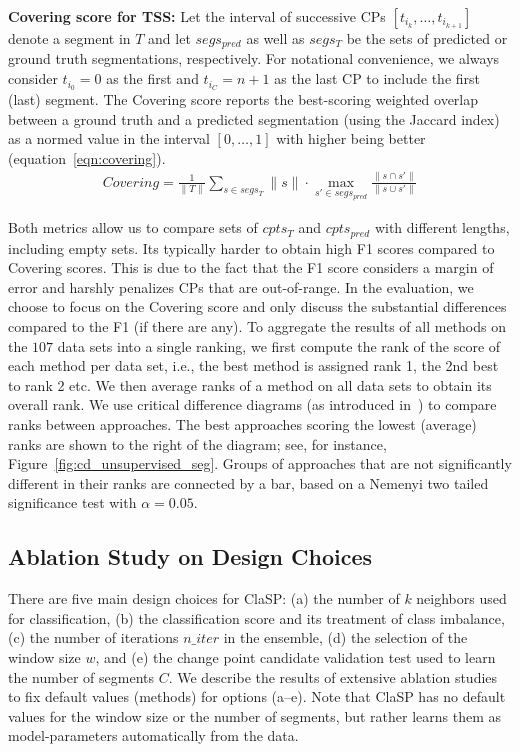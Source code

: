 \documentclass[pdflatex,sn-basic]{sn-jnl}
\begin{document}
\textbf{Covering score for TSS:} Let the interval of successive CPs $[t_{i_k},\dots,t_{i_{k+1}}]$ denote a segment in $T$ and let $segs_{pred}$ as well as $segs_{T}$ be the sets of predicted or ground truth segmentations, respectively. For notational convenience, we always consider $t_{i_0} = 0$ as the first and $t_{i_{C}} = n+1$ as the last CP to include the first (last) segment. The Covering score reports the best-scoring weighted overlap between a ground truth and a predicted segmentation (using the Jaccard index) as a normed value in the interval $[0,\dots,1]$ with higher being better (equation~\ref{eqn:covering}). 
\begin{align}
    Covering = \frac{1}{\|T\|} \sum_{s \in segs_{T}} \|s\| \cdot \max_{s' \in segs_{pred}} \frac{\| s \cap s' \|}{\| s \cup s' \|}
    \label{eqn:covering}
\end{align}

Both metrics allow us to compare sets of $cpts_{T}$ and $cpts_{pred}$ with different lengths, including empty sets. Its typically harder to obtain high F1 scores compared to Covering scores. This is due to the fact that the F1 score considers a margin of error and harshly penalizes CPs that are out-of-range. In the evaluation, we choose to focus on the Covering score and only discuss the substantial differences compared to the F1 (if there are any). To aggregate the results of all methods on the $107$ data sets into a single ranking, we first compute the rank of the score of each method per data set, i.e., the best method is assigned rank 1, the 2nd best to rank 2 etc. We then average ranks of a method on all data sets to obtain its overall rank. We use critical difference diagrams (as introduced in~\citep{demvsar2006statistical}) to compare ranks between approaches. The best approaches scoring the lowest (average) ranks are shown to the right of the diagram; see, for instance, Figure~\ref{fig:cd_unsupervised_seg}. Groups of approaches that are not significantly different in their ranks are connected by a bar, based on a Nemenyi two tailed significance test with $\alpha=0.05$. 


\subsection{Ablation Study on Design Choices}
\label{sec:design_choices}

There are five main design choices for ClaSP: (a) the number of $k$ neighbors used for classification, (b) the classification score and its treatment of class imbalance, (c) the number of iterations $n\_iter$ in the ensemble, (d) the selection of the window size $w$, and (e) the change point candidate validation test used to learn the number of segments $C$. We describe the results of extensive ablation studies to fix default values (methods) for options (a--e). Note that ClaSP has no default values for the window size or the number of segments, but rather learns them as model-parameters automatically from the data.
\end{document}
